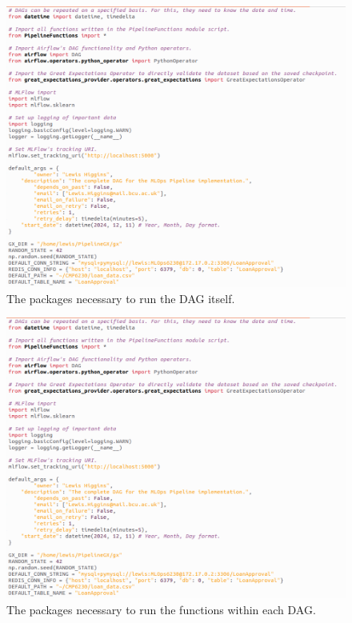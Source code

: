 \documentclass[12pt]{report}
\begin{document}
\begin{figure}[H]
    \centering
    \includegraphics[width=\linewidth]{Implementation/.Code/PipelineDAGImports.png}
    \caption{The packages necessary to run the DAG itself.}
    \label{fig:PipelineDAGImports}
\end{figure}

\begin{figure}[H]
    \centering
    \includegraphics[width=\linewidth]{Implementation/.Code/PipelineDAGImports.png}
    \caption{The packages necessary to run the functions within each DAG.}
    \label{fig:PipelineFunctionsImports}
\end{figure}
\end{document}
